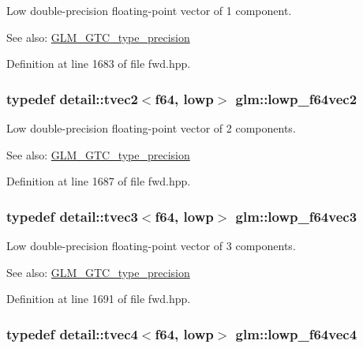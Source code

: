 Low double-precision floating-point vector of 1 component. \begin{Desc}
\item[See also:]\hyperlink{group__gtc__type__precision}{GLM\_\-GTC\_\-type\_\-precision} \end{Desc}


Definition at line 1683 of file fwd.hpp.\hypertarget{group__gtc__type__precision_gf2c6cba98bb2c2f1560d8edff4b70938}{
\subsubsection[lowp\_\-f64vec2]{\setlength{\rightskip}{0pt plus 5cm}typedef detail::tvec2$<$f64, lowp$>$ {\bf glm::lowp\_\-f64vec2}}}
\label{group__gtc__type__precision_gf2c6cba98bb2c2f1560d8edff4b70938}


Low double-precision floating-point vector of 2 components. \begin{Desc}
\item[See also:]\hyperlink{group__gtc__type__precision}{GLM\_\-GTC\_\-type\_\-precision} \end{Desc}


Definition at line 1687 of file fwd.hpp.\hypertarget{group__gtc__type__precision_gd2d5e1436d926ae7201c860dce01a0fe}{
\subsubsection[lowp\_\-f64vec3]{\setlength{\rightskip}{0pt plus 5cm}typedef detail::tvec3$<$f64, lowp$>$ {\bf glm::lowp\_\-f64vec3}}}
\label{group__gtc__type__precision_gd2d5e1436d926ae7201c860dce01a0fe}


Low double-precision floating-point vector of 3 components. \begin{Desc}
\item[See also:]\hyperlink{group__gtc__type__precision}{GLM\_\-GTC\_\-type\_\-precision} \end{Desc}


Definition at line 1691 of file fwd.hpp.\hypertarget{group__gtc__type__precision_gf99497c42a2d011fecab7f3f2312213d}{
\subsubsection[lowp\_\-f64vec4]{\setlength{\rightskip}{0pt plus 5cm}typedef detail::tvec4$<$f64, lowp$>$ {\bf glm::lowp\_\-f64vec4}}}
\label{group__gtc__type__precision_gf99497c42a2d011fecab7f3f2312213d}


